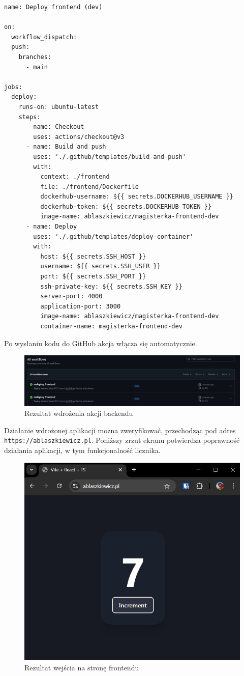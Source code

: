 \documentclass{article}
\begin{document}
\begin{lstlisting}[caption=Plik \texttt{.github/workflows/dev-deploy-frontend.yml}]
name: Deploy frontend (dev)

on:
  workflow_dispatch:
  push:
    branches:
      - main

jobs:
  deploy:
    runs-on: ubuntu-latest
    steps:
      - name: Checkout
        uses: actions/checkout@v3
      - name: Build and push
        uses: './.github/templates/build-and-push'
        with:
          context: ./frontend
          file: ./frontend/Dockerfile
          dockerhub-username: ${{ secrets.DOCKERHUB_USERNAME }}
          dockerhub-token: ${{ secrets.DOCKERHUB_TOKEN }}
          image-name: ablaszkiewicz/magisterka-frontend-dev
      - name: Deploy
        uses: './.github/templates/deploy-container'
        with:
          host: ${{ secrets.SSH_HOST }}
          username: ${{ secrets.SSH_USER }}
          port: ${{ secrets.SSH_PORT }}
          ssh-private-key: ${{ secrets.SSH_KEY }}
          server-port: 4000
          application-port: 3000
          image-name: ablaszkiewicz/magisterka-frontend-dev
          container-name: magisterka-frontend-dev

\end{lstlisting}

Po wysłaniu kodu do GitHub akcja włącza się automatycznie.

\begin{figure}[H]
    \centering
    \includegraphics[width=1\linewidth]{rezultatPierwszejAkcjiFrontend.png}
    \caption{Rezultat wdrożenia akcji backendu}
    \label{fig:enter-label}
\end{figure}

Działanie wdrożonej aplikacji można zweryfikować, przechodząc pod adres \lstinline|https://ablaszkiewicz.pl|. Poniższy zrzut ekranu potwierdza poprawność działania aplikacji, w tym funkcjonalność licznika.

\begin{figure}[H]
    \centering
    \includegraphics[width=0.5\linewidth]{rezultatWejsciaNaFrontend.png}
    \caption{Rezultat wejścia na stronę frontendu}
    \label{fig:enter-label}
\end{figure}
\end{document}
